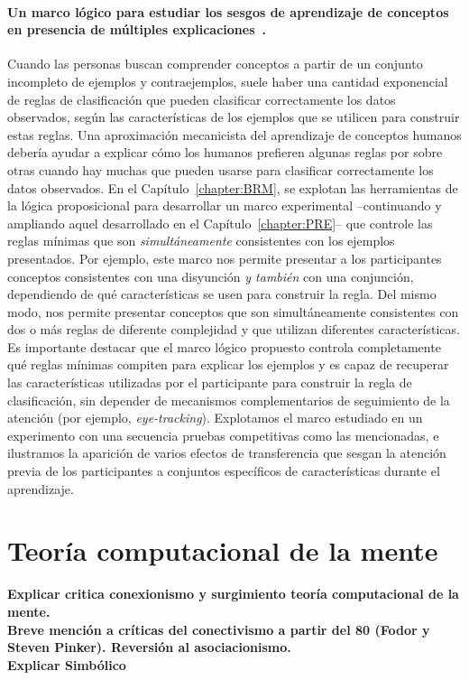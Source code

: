 \paragraph{Un marco lógico para estudiar los sesgos de aprendizaje de conceptos en presencia de múltiples explicaciones~\cite{tano2021framework}.}
Cuando las personas buscan comprender conceptos a partir de un conjunto incompleto de ejemplos y contraejemplos, suele haber una cantidad exponencial de reglas de clasificación que pueden clasificar correctamente los datos observados, según las características de los ejemplos que se utilicen para construir estas reglas. Una aproximación mecanicista del aprendizaje de conceptos humanos debería ayudar a explicar cómo los humanos prefieren algunas reglas por sobre otras cuando hay muchas que pueden usarse para clasificar correctamente los datos observados. En el Capítulo~\ref{chapter:BRM}, se explotan las herramientas de la lógica proposicional para desarrollar un marco experimental --continuando y ampliando aquel desarrollado en el Capítulo~\ref{chapter:PRE}-- que controle las reglas mínimas que son \textit{simultáneamente} consistentes con los ejemplos presentados. Por ejemplo, este marco nos permite presentar a los participantes conceptos consistentes con una disyunción \textit{y también} con una conjunción, dependiendo de qué características se usen para construir la regla. Del mismo modo, nos permite presentar conceptos que son simultáneamente consistentes con dos o más reglas de diferente complejidad y que utilizan diferentes características. Es importante destacar que el marco lógico propuesto controla completamente qué reglas mínimas compiten para explicar los ejemplos y es capaz de recuperar las características utilizadas por el participante para construir la regla de clasificación, sin depender de mecanismos complementarios de seguimiento de la atención (por ejemplo, {\em eye-tracking}). Explotamos el marco estudiado en un experimento con una secuencia pruebas competitivas como las mencionadas, e ilustramos la aparición de varios efectos de transferencia que sesgan la atención previa de los participantes a conjuntos específicos de características durante el aprendizaje.




\section{Teoría computacional de la mente}
\textbf{Explicar critica conexionismo y surgimiento teoría computacional de la mente.} \\
\textbf{Breve mención a críticas del conectivismo a partir del 80 (Fodor y Steven Pinker). Reversión al asociacionismo.}\\
\textbf{Explicar Simbólico}\\

